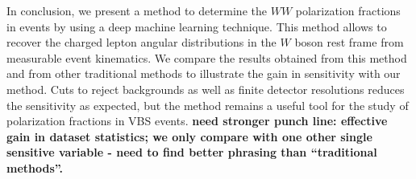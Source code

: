 In conclusion, we present a method to determine the $WW$ polarization fractions in
\ssWW events by using a deep machine learning technique.  This method
allows to recover the charged lepton angular distributions in the $W$
boson rest frame from measurable event kinematics.  We compare the
results obtained from this method and from other traditional methods
to illustrate the gain in sensitivity with our method.  Cuts to reject
backgrounds as well as finite detector resolutions reduces the sensitivity as
expected, but the method remains a useful tool for the study of
polarization fractions in VBS events.
{\bf need stronger punch line: effective gain in dataset statistics;
we only compare with one other single sensitive variable - need to find
better phrasing than ``traditional methods''.}

\begin{thebibliography}{99}

\end{thebibliography}

